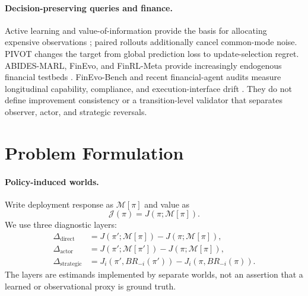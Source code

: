 \documentclass{article}
\newcommand{\M}{\mathcal{M}}
\newcommand{\J}{\mathcal{J}}
\newcommand{\pii}{\pi}
\newcommand{\pip}{\pi'}
\begin{document}
\paragraph{Decision-preserving queries and finance.}
Active learning and value-of-information provide the basis for allocating
expensive observations \cite{settles2009active,lindley1956information}; paired
rollouts additionally cancel common-mode noise.  PIVOT changes the target from
global prediction loss to update-selection regret.  ABIDES-MARL, FinEvo, and
FinRL-Meta provide increasingly endogenous financial testbeds
\cite{abidesmarl2025,finevo2026,finrlmeta2022,byrd2019abides,cont2010price,
nevmyvaka2006execution}.  FinEvo-Bench and recent financial-agent audits measure
longitudinal capability, compliance, and execution-interface drift
\cite{finevobench2026,auditingfinagents2026}.  They do not define improvement consistency or a
transition-level validator that separates observer, actor, and strategic
reversals.

\section{Problem Formulation}
\paragraph{Policy-induced worlds.}
Write deployment response as $\M[\pi]$ and value as
\begin{equation}
  \J(\pi)=J(\pi;\M[\pi]).
\end{equation}
We use three diagnostic layers:
\begin{align}
 \Delta_{\mathrm{direct}} &= J(\pip;\M[\pii])-J(\pii;\M[\pii]),\\
 \Delta_{\mathrm{actor}} &= J(\pip;\M[\pip])-J(\pii;\M[\pii]),\\
 \Delta_{\mathrm{strategic}} &=
 J_i(\pip,BR_{-i}(\pip))-J_i(\pii,BR_{-i}(\pii)).
\end{align}
The layers are estimands implemented by separate worlds, not an assertion
that a learned or observational proxy is ground truth.
\end{document}
